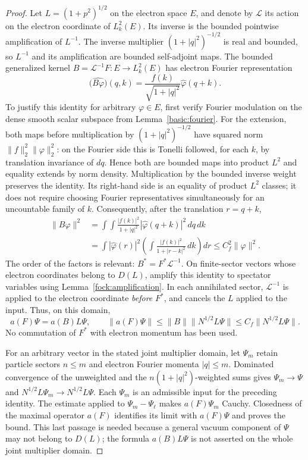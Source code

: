 \documentclass[11pt,a4paper]{article}
\theoremstyle{definition}
\theoremstyle{remark}
\begin{document}
\begin{proof}
Let $L=(1+p^2)^{1/2}$ on the electron space $E$, and denote by
$\mathcal L$ its action on the electron coordinate of $L^2_k(E)$.
Its inverse is the bounded pointwise amplification of $L^{-1}$.
The inverse multiplier $(1+|q|^2)^{-1/2}$ is real and bounded,
so $L^{-1}$ and its amplification are bounded self-adjoint maps.
The bounded generalized kernel $B=\mathcal L^{-1}F:E\to L^2_k(E)$
has electron Fourier representation
\[
 \big(\widehat{B\varphi}\big)(q,k)
       =\frac{f(k)}{\sqrt{1+|q|^2}}\widehat\varphi(q+k).
\]
To justify this identity for arbitrary $\varphi\in E$, first verify
Fourier modulation on the dense smooth scalar subspace from
Lemma~\ref{basic:fourier}. For the extension, both maps before
multiplication by $(1+|q|^2)^{-1/2}$ have squared norm
$\|f\|_2^2\|\varphi\|_2^2$: on the Fourier side this is Tonelli
followed, for each $k$, by translation invariance of $dq$. Hence
both are bounded maps into product $L^2$ and equality extends by
norm density. Multiplication by the bounded inverse weight preserves
the identity. Its right-hand side is an equality of product
$L^2$ classes; it does not require choosing Fourier representatives
simultaneously for an uncountable family of $k$.
Consequently, after the translation $r=q+k$,
\begin{align*}
 \|B\varphi\|^2
  &=\int\!\int\frac{|f(k)|^2}{1+|q|^2}
                       |\widehat\varphi(q+k)|^2\,dq\,dk\\
  &=\int |\widehat\varphi(r)|^2
            \left(\int\frac{|f(k)|^2}{1+|r-k|^2}\,dk\right)dr
   \leq C_f^2\|\varphi\|^2.
\end{align*}
The order of the factors is relevant:
$B^*=F^*\mathcal L^{-1}$. On finite-sector vectors whose electron
coordinates belong to $D(L)$, amplify this identity to spectator
variables using Lemma~\ref{fock:amplification}. In each annihilated
sector, $\mathcal L^{-1}$ is applied to the electron coordinate
\emph{before} $F^*$, and cancels the $L$ applied to the input.
Thus, on this domain,
\[
 a(F)\Psi=a(B)L\Psi,
 \qquad
 \|a(F)\Psi\|\leq\|B\|\|N^{1/2}L\Psi\|
                      \leq C_f\|N^{1/2}L\Psi\|.
\]
No commutation of $F^*$ with electron momentum has been used.

For an arbitrary vector in the stated joint multiplier domain, let
$\Psi_m$ retain particle sectors $n\leq m$ and electron Fourier
momenta $|q|\leq m$. Dominated convergence of the unweighted and
the $n(1+|q|^2)$-weighted sums gives
$\Psi_m\to\Psi$ and $N^{1/2}L\Psi_m\to N^{1/2}L\Psi$.
Each $\Psi_m$ is an admissible input for the preceding identity.
The estimate applied to $\Psi_m-\Psi_\ell$ makes
$a(F)\Psi_m$ Cauchy. Closedness of the maximal operator $a(F)$
identifies its limit with $a(F)\Psi$ and proves the bound.
This last passage is needed because a general vacuum component of
$\Psi$ may not belong to $D(L)$; the formula $a(B)L\Psi$ is
not asserted on the whole joint multiplier domain.
\end{proof}
\end{document}
